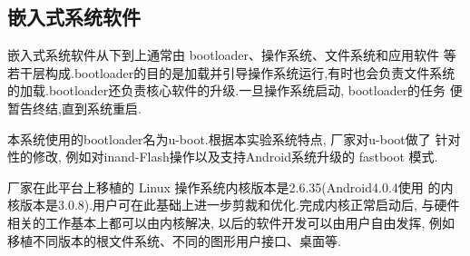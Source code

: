 \subsection{嵌入式系统软件}
	嵌入式系统软件从下到上通常由 bootloader、操作系统、文件系统和应用软件
等若干层构成.bootloader的目的是加载并引导操作系统运行,有时也会负责文件系统
的加载.bootloader还负责核心软件的升级.一旦操作系统启动, bootloader的任务
便暂告终结,直到系统重启.

	本系统使用的bootloader名为u-boot.根据本实验系统特点, 厂家对u-boot做了
针对性的修改, 例如对inand-Flash操作以及支持Android系统升级的 fastboot 模式.

	厂家在此平台上移植的 Linux 操作系统内核版本是2.6.35(Android4.0.4使用
的内核版本是3.0.8).用户可在此基础上进一步剪裁和优化.完成内核正常启动后,
与硬件相关的工作基本上都可以由内核解决, 以后的软件开发可以由用户自由发挥,
例如移植不同版本的根文件系统、不同的图形用户接口、桌面等.

